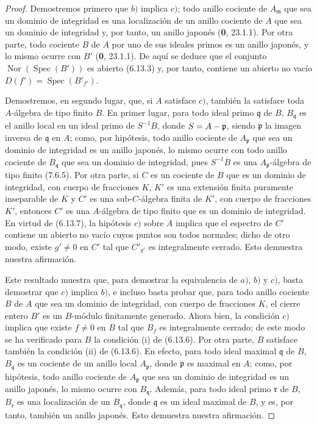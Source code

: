 \begin{proof}
Demostremos primero que $b)$ implica $c)$; todo anillo cociente de
$A_{\mathfrak m}$ que sea un dominio de integridad es una localización de
un anillo cociente de $A$ que sea un dominio de integridad y, por tanto,
un anillo japonés (\textbf 0, 23.1.1). Por otra parte, todo cociente $B$ de $A$ por
uno de sus ideales primos es un anillo japonés, y lo mismo ocurre con $B'$
(\textbf 0, 23.1.1). De aquí se deduce que el conjunto
$\operatorname{Nor}(\operatorname{Spec}(B'))$ es abierto (6.13.3) y, por
tanto, contiene un abierto no vacío
$D(f')=\operatorname{Spec}(B'_{f'})$.


Demostremos, en segundo lugar, que, si $A$ satisface $c)$, también la
satisface toda $A$-álgebra de tipo finito $B$. En primer lugar, para todo
ideal primo $\mathfrak q$ de $B$, $B_{\mathfrak q}$ es el anillo local en
un ideal primo de $S^{-1}B$, donde $S=A-\mathfrak p$, siendo
$\mathfrak p$ la imagen inversa de $\mathfrak q$ en $A$; como, por
hipótesis, todo anillo cociente de $A_{\mathfrak p}$ que sea un dominio
de integridad es un anillo japonés, lo mismo ocurre con todo anillo
cociente de $B_{\mathfrak q}$ que sea un dominio de integridad, pues
$S^{-1}B$ es una $A_{\mathfrak p}$-álgebra de tipo finito (7.6.5).
Por otra parte, si $C$ es un cociente de $B$ que es un dominio de
integridad, con cuerpo de fracciones $K$, $K'$ es una extensión finita
puramente inseparable de $K$ y $C'$ es una sub-$C$-álgebra finita de
$K'$, con cuerpo de fracciones $K'$, entonces $C'$ es una $A$-álgebra de
tipo finito que es un dominio de integridad. En virtud de (6.13.7), la
hipótesis $c)$ sobre $A$ implica que el espectro de $C'$ contiene un
abierto no vacío cuyos puntos son todos normales; dicho de otro modo,
existe $g'\neq0$ en $C'$ tal que $C'_{g'}$ es integralmente cerrado.
Esto demuestra nuestra afirmación.

Este resultado muestra que, para demostrar la equivalencia de $a)$, $b)$
y $c)$, basta demostrar que $c)$ implica $b)$, e incluso basta probar que,
para todo anillo cociente $B$ de $A$ que sea un dominio de integridad,
con cuerpo de fracciones $K$, el cierre entero $B'$ es un $B$-módulo
finitamente generado. Ahora bien, la condición $c)$ implica que existe
$f\neq0$ en $B$ tal que $B_f$ es integralmente cerrado; de este modo se
ha verificado para $B$ la condición (i) de (6.13.6). Por otra parte, $B$
satisface también la condición (ii) de (6.13.6). En efecto, para todo
ideal maximal $\mathfrak q$ de $B$, $B_{\mathfrak q}$ es un cociente de
un anillo local $A_{\mathfrak p}$, donde $\mathfrak p$ es maximal en
$A$; como, por hipótesis, todo anillo cociente de $A_{\mathfrak p}$ que sea un dominio de integridad es un anillo japonés,
lo mismo ocurre con $B_{\mathfrak q}$. Además, para todo ideal primo
$\mathfrak r$ de $B$, $B_{\mathfrak r}$ es una localización de un
$B_{\mathfrak q}$, donde $\mathfrak q$ es un ideal maximal de $B$, y es,
por tanto, también un anillo japonés. Esto demuestra nuestra afirmación.


\end{proof}
